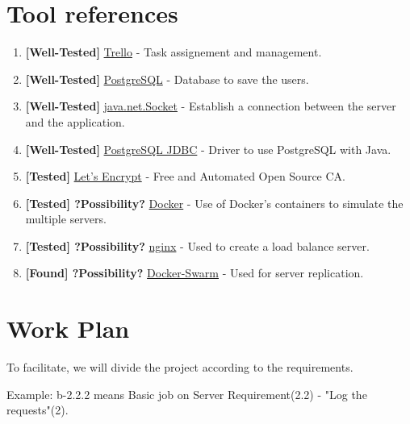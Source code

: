 \documentclass[a4paper,titlepage,11pt]{article}
\begin{document}
\section{Tool references}
\begin{enumerate}
  \item \textbf{[Well-Tested]} \href{https://trello.com/}{Trello} - Task assignement and management.
  \item \textbf{[Well-Tested]} \href{https://www.postgresql.org}{PostgreSQL} - Database to save the users.
  \item \textbf{[Well-Tested]} \href{https://docs.oracle.com/javase/7/docs/api/java/net/Socket.html}{java.net.Socket} - Establish a connection between the server and the application.
  \item \textbf{[Well-Tested]} \href{https://jdbc.postgresql.org}{PostgreSQL JDBC} - Driver to use PostgreSQL with Java.
  \item \textbf{[Tested]} \href{https://letsencrypt.org}{Let's Encrypt} - Free and Automated Open Source CA.
  \item \textbf{[Tested] ?Possibility?} \href{https://www.docker.com}{Docker} - Use of Docker's containers to simulate the multiple servers.
  \item \textbf{[Tested] ?Possibility?} \href{https://www.nginx.com}{nginx} - Used to create a load balance server.
  \item \textbf{[Found] ?Possibility?} \href{https://docs.docker.com/swarm/overview/}{Docker-Swarm} - Used for server replication.
\end{enumerate}

\section{Work Plan}
To facilitate, we will divide the project according to the requirements.

Example: b-2.2.2 means Basic job on Server Requirement(2.2) - "Log the requests"(2).
\end{document}
